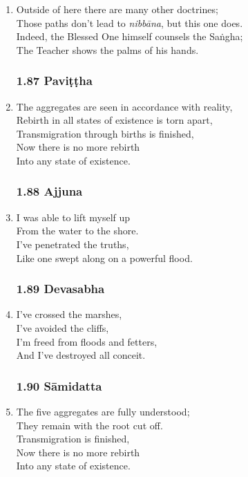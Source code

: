 \documentclass[10pt, openany]{book}
\begin{document}
\begin{enumerate}
\item Outside of here there are many other doctrines;\\
Those paths don’t lead to \emph{nibbāna}, but this one does.\\
Indeed, the Blessed One himself counsels the Saṅgha;\\
The Teacher shows the palms of his hands.

\subsubsection*{1.87 Paviṭṭha}

\item The aggregates are seen in accordance with reality,\\
Rebirth in all states of existence is torn apart,\\
Transmigration through births is finished,\\
Now there is no more rebirth \\
Into any state of existence.

\subsubsection*{1.88 Ajjuna}

\item I was able to lift myself up\\
From the water to the shore.\\
I’ve penetrated the truths,\\
Like one swept along on a powerful flood.

\subsubsection*{1.89 Devasabha}

\item I’ve crossed the marshes,\\
I’ve avoided the cliffs,\\
I’m freed from floods and fetters,\\
And I've destroyed all conceit.

\subsubsection*{1.90 Sāmidatta}

\item The five aggregates are fully understood;\\
They remain with the root cut off.\\
Transmigration is finished,\\
Now there is no more rebirth \\
Into any state of existence.


\end{enumerate}
\end{document}
